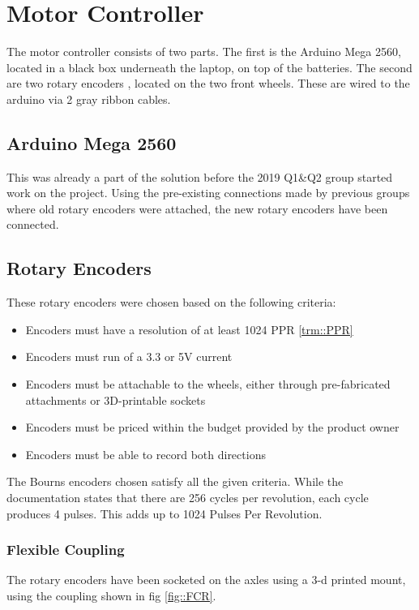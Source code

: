 \section{Motor Controller}
The motor controller consists of two parts.
The first is the Arduino Mega 2560, located in a black box underneath the laptop, on top of the batteries.
The second are two rotary encoders \cite{roten}, located on the two front wheels.
These are wired to the arduino via 2 gray ribbon cables.

\subsection{Arduino Mega 2560}
This was already a part of the solution before the 2019 Q1\&Q2 group started work on the project.
Using the pre-existing connections made by previous groups where old rotary encoders were attached, the new rotary encoders have been connected.

\subsection{Rotary Encoders}
These rotary encoders were chosen based on the following criteria:

\begin{itemize}
\item Encoders must have a resolution of at least 1024 PPR \ref{trm::PPR}
\item Encoders must run of a 3.3 or 5V current
\item Encoders must be attachable to the wheels, either through pre-fabricated attachments or 3D-printable sockets
\item Encoders must be priced within the budget provided by the product owner
\item Encoders must be able to record both directions
\end{itemize}

The Bourns encoders chosen satisfy all the given criteria.
While the documentation states that there are 256 cycles per revolution, each cycle produces 4 pulses.
This adds up to 1024 Pulses Per Revolution.


\subsubsection{Flexible Coupling}
The rotary encoders have been socketed on the axles using a 3-d printed mount, using the coupling shown in fig \ref{fig::FCR}.

